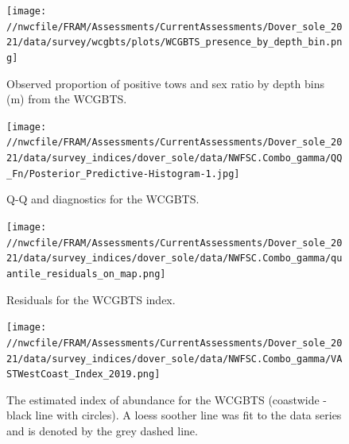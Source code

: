 \documentclass[11pt,
  english,
  a4paper,
]{article}
\begin{document}
\tagmcend\tagstructend

\clearpage


\begin{figure}
\centering
\texttt{[image: //nwcfile/FRAM/Assessments/CurrentAssessments/Dover\_sole\_2021/data/survey/wcgbts/plots/WCGBTS\_presence\_by\_depth\_bin.png]}
\caption{Observed proportion of positive tows and sex ratio by depth bins (m) from the WCGBTS.\label{fig:pos-tows-sex-ratio}}
\end{figure}

\tagmcend\tagstructend

\newpage


\begin{figure}
\centering
\texttt{[image: //nwcfile/FRAM/Assessments/CurrentAssessments/Dover\_sole\_2021/data/survey\_indices/dover\_sole/data/NWFSC.Combo\_gamma/QQ\_Fn/Posterior\_Predictive-Histogram-1.jpg]}
\caption{Q-Q and diagnostics for the WCGBTS.\label{fig:wcgbt-qq}}
\end{figure}

\tagmcend\tagstructend

\newpage


\begin{figure}
\centering
\texttt{[image: //nwcfile/FRAM/Assessments/CurrentAssessments/Dover\_sole\_2021/data/survey\_indices/dover\_sole/data/NWFSC.Combo\_gamma/quantile\_residuals\_on\_map.png]}
\caption{Residuals for the WCGBTS index.\label{fig:wcgbt-resid}}
\end{figure}

\tagmcend\tagstructend

\newpage


\begin{figure}
\centering
\texttt{[image: //nwcfile/FRAM/Assessments/CurrentAssessments/Dover\_sole\_2021/data/survey\_indices/dover\_sole/data/NWFSC.Combo\_gamma/VASTWestCoast\_Index\_2019.png]}
\caption{The estimated index of abundance for the WCGBTS (coastwide - black line with circles). A loess soother line was fit to the data series and is denoted by the grey dashed line.\label{fig:wcgbt-index}}
\end{figure}
\end{document}
